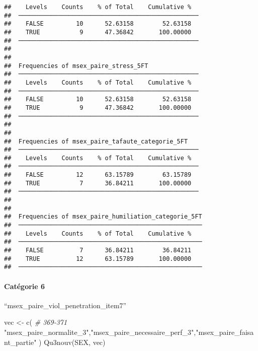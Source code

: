 \documentclass[
]{article}
\newenvironment{Shaded}{\begin{snugshade}}{\end{snugshade}}
\newcommand{\CommentTok}[1]{\textcolor[rgb]{0.56,0.35,0.01}{\textit{#1}}}
\newcommand{\FunctionTok}[1]{\textcolor[rgb]{0.00,0.00,0.00}{#1}}
\newcommand{\NormalTok}[1]{#1}
\newcommand{\OtherTok}[1]{\textcolor[rgb]{0.56,0.35,0.01}{#1}}
\newcommand{\StringTok}[1]{\textcolor[rgb]{0.31,0.60,0.02}{#1}}
\begin{document}
\begin{verbatim}
##    Levels    Counts    % of Total    Cumulative %   
##  ────────────────────────────────────────────────── 
##    FALSE         10      52.63158        52.63158   
##    TRUE           9      47.36842       100.00000   
##  ────────────────────────────────────────────────── 
## 
## 
##  Frequencies of msex_paire_stress_5FT               
##  ────────────────────────────────────────────────── 
##    Levels    Counts    % of Total    Cumulative %   
##  ────────────────────────────────────────────────── 
##    FALSE         10      52.63158        52.63158   
##    TRUE           9      47.36842       100.00000   
##  ────────────────────────────────────────────────── 
## 
## 
##  Frequencies of msex_paire_tafaute_categorie_5FT    
##  ────────────────────────────────────────────────── 
##    Levels    Counts    % of Total    Cumulative %   
##  ────────────────────────────────────────────────── 
##    FALSE         12      63.15789        63.15789   
##    TRUE           7      36.84211       100.00000   
##  ────────────────────────────────────────────────── 
## 
## 
##  Frequencies of msex_paire_humiliation_categorie_5FT 
##  ─────────────────────────────────────────────────── 
##    Levels    Counts    % of Total    Cumulative %   
##  ─────────────────────────────────────────────────── 
##    FALSE          7      36.84211        36.84211   
##    TRUE          12      63.15789       100.00000   
##  ───────────────────────────────────────────────────
\end{verbatim}

\hypertarget{catuxe9gorie-6}{%
\paragraph{Catégorie 6}\label{catuxe9gorie-6}}

``msex\_paire\_viol\_penetration\_item7''

\begin{Shaded}
\begin{Highlighting}[]
\NormalTok{vec }\OtherTok{\textless{}{-}} \FunctionTok{c}\NormalTok{(  }\CommentTok{\# 369{-}371}
  \StringTok{"msex\_paire\_normalite\_3"}\NormalTok{,}\StringTok{"msex\_paire\_necessaire\_perf\_3"}\NormalTok{,}\StringTok{"msex\_paire\_faisant\_partie"}
\NormalTok{)}
\FunctionTok{Qu3nouv}\NormalTok{(SEX, vec)}
\end{Highlighting}
\end{Shaded}
\end{document}
